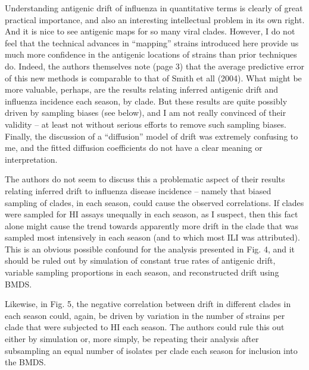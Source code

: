 \documentclass[11pt,oneside,letterpaper]{article}
\begin{document}
Understanding antigenic drift of influenza in quantitative terms is clearly of great practical importance, and also an interesting intellectual problem in its own right. And it is nice to see antigenic maps for so many viral clades. However, I do not feel that the technical advances in ``mapping'' strains introduced here provide us much more confidence in the antigenic locations of strains than prior techniques do. Indeed, the authors themselves note (page 3) that the average predictive error of this new methods is comparable to that of Smith et all (2004). What might be more valuable, perhaps, are the results relating inferred antigenic drift and influenza incidence each season, by clade. But these results are quite possibly driven by sampling biases (see below), and I am not really convinced of their validity -- at least not without serious efforts to remove such sampling biases. Finally, the discussion of a ``diffusion'' model of drift was extremely confusing to me, and the fitted diffusion coefficients do not have a clear meaning or interpretation.

The authors do not seem to discuss this a problematic aspect of their results relating inferred drift to influenza disease incidence -- namely that biased sampling of clades, in each season, could cause the observed correlations. If clades were sampled for HI assays unequally in each season, as I suspect, then this fact alone might cause the trend towards apparently more drift in the clade that was sampled most intensively in each season (and to which most ILI was attributed). This is an obvious possible confound for the analysis presented in Fig. 4, and it should be ruled out by simulation of constant true rates of antigenic drift, variable sampling proportions in each season, and reconstructed drift using BMDS.

Likewise, in Fig. 5, the negative correlation between drift in different clades in each season could, again, be driven by variation in the number of strains per clade that were subjected to HI each season. The authors could rule this out either by simulation or, more simply, be repeating their analysis after subsampling an equal number of isolates per clade each season for inclusion into the BMDS.
\end{document}
